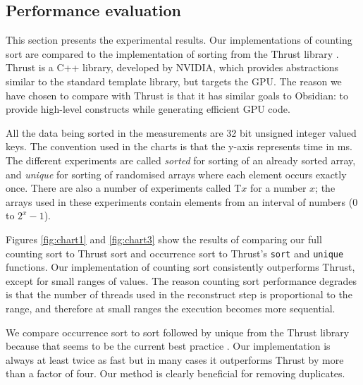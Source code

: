 
\subsection{Performance evaluation} 
\label{sec:CSORTBenchmarks}

\FloatBarrier

This section presents the experimental results. Our implementations of
counting sort are compared to the implementation of sorting from the
Thrust library \cite{THRUST}. Thrust is a C++ library, developed by
NVIDIA, which provides abstractions similar to the standard template
library, but targets the GPU. The reason we have chosen to compare with
Thrust is that it has similar goals to Obsidian: to provide high-level 
constructs while generating efficient GPU code.

All the data being sorted in the measurements are 32 bit unsigned
integer valued keys.
The convention used in the charts is that the y-axis represents time in ms. 
The different experiments are called {\em sorted} for sorting of an 
already sorted array, and {\em unique} for sorting of randomised arrays where each 
element occurs exactly once. There are also a number of experiments called 
T$x$ for a number $x$;  the arrays used in these experiments contain
elements from an interval of numbers (0 to $2^x-1$). 

Figures \ref{fig:chart1} and \ref{fig:chart3} show the results of
comparing our full counting sort to Thrust sort and occurrence sort
 to Thrust's {\tt sort} and {\tt unique} functions.
Our implementation of
counting sort consistently outperforms Thrust, except for small ranges
of values. The reason counting sort performance degrades is that the
number of threads used in the reconstruct step is proportional to the
range, and therefore at small ranges the execution becomes more
sequential.

We compare occurrence sort to sort followed by unique from
the Thrust library because that seems to be the current best practice
\cite{REMOVEDUPS}. Our implementation is always at least twice as fast
but in many cases it outperforms Thrust by more than a factor of four.
Our method is clearly beneficial for removing duplicates.


